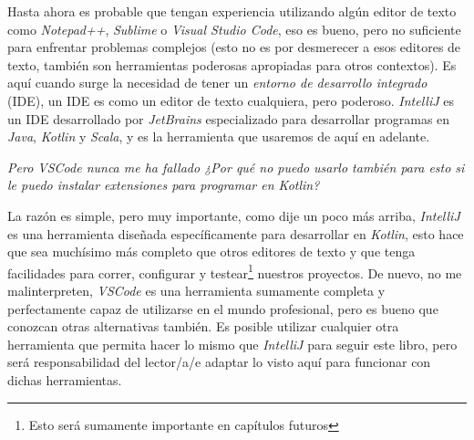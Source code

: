 Hasta ahora es probable que tengan experiencia utilizando algún editor de texto como 
\textit{Notepad++}, \textit{Sublime} o \textit{Visual Studio Code}, eso es bueno, pero no 
suficiente para enfrentar problemas complejos (esto no es por desmerecer a esos editores de 
texto, también son herramientas poderosas apropiadas para otros contextos).
Es aquí cuando surge la necesidad de tener un \textit{entorno de desarrollo 
integrado} (IDE), un IDE es como un editor de texto 
cualquiera, pero poderoso.
\textit{IntelliJ} es un IDE desarrollado por \textit{JetBrains} especializado 
para desarrollar programas en \textit{Java}, \textit{Kotlin} y \textit{Scala}, y es la herramienta 
que usaremos de aquí en adelante.
\begin{center}
  \textit{
    Pero VSCode nunca me ha fallado ¿Por qué no puedo usarlo también para esto si le puedo 
    instalar extensiones para programar en Kotlin?
  }
\end{center}

La razón es simple, pero muy importante, como dije un poco más arriba, \textit{IntelliJ} es una
herramienta diseñada específicamente para desarrollar en \textit{Kotlin}, esto hace que sea 
muchísimo más completo que otros editores de texto y que tenga facilidades para correr, configurar y 
testear\footnote{Esto será sumamente importante en capítulos futuros} nuestros proyectos.
De nuevo, no me malinterpreten, \textit{VSCode} es una herramienta sumamente completa y 
perfectamente capaz de utilizarse en el mundo profesional, pero es bueno que conozcan otras 
alternativas también.
Es posible utilizar cualquier otra herramienta que permita hacer lo mismo que \textit{IntelliJ}
para seguir este libro, pero será responsabilidad del lector/a/e adaptar lo visto aquí para 
funcionar con dichas herramientas.\footnotemark


